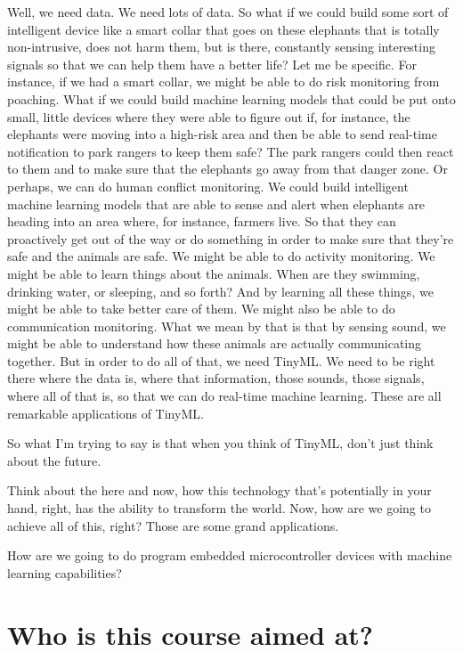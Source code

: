 Well, we need data.
We need lots of data.
So what if we could build some sort of intelligent device
like a smart collar that goes on these elephants that
is totally non-intrusive, does not harm them, but is there,
constantly sensing interesting signals so that we can help them have a better life?
Let me be specific.
For instance, if we had a smart collar, we might be able to do risk monitoring from poaching.
What if we could build machine learning models that could be put onto small, little devices where they were able to figure out if, for instance, the elephants were moving into a high-risk area and then be able to send real-time notification to park rangers to keep them safe?
The park rangers could then react to them and to make sure that the elephants go away from that danger zone.
Or perhaps, we can do human conflict monitoring.
We could build intelligent machine learning models that are able to sense and alert when elephants are heading into an area where, for instance, farmers live.
So that they can proactively get out of the way or do something in order to make sure that they're safe and the animals are safe.
We might be able to do activity monitoring.
We might be able to learn things about the animals.
When are they swimming, drinking water, or sleeping, and so forth?
And by learning all these things, we might be able to take better care of them.
We might also be able to do communication monitoring.
What we mean by that is that by sensing sound, we might be able to understand how these animals are actually
communicating together.
But in order to do all of that, we need TinyML.
We need to be right there where the data is, where that information, those sounds, those signals, where all of that is, so that we can do real-time machine learning.
These are all remarkable applications of TinyML.



So what I'm trying to say is that when you think of TinyML, don't just think about the future.


Think about the here and now, how this technology that's potentially in your hand, right, has the ability to transform the world.
Now, how are we going to achieve all of this, right?
Those are some grand applications.




How are we going to do program embedded microcontroller devices with machine learning capabilities?



\section{Who is this course aimed at?}





